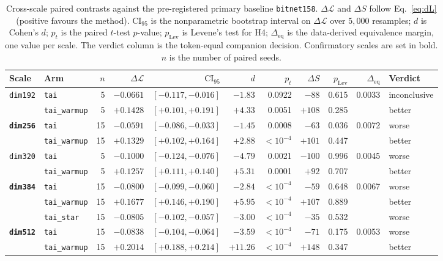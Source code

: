 \documentclass[final,5p,times,twocolumn]{elsarticle}
\theoremstyle{remark}
\newcommand{\dL}{\Delta\mathcal{L}}
\newcommand{\dS}{\Delta S}
\begin{document}
\begin{table}[t]
\centering
\scriptsize
\caption{Cross-scale paired contrasts against the pre-registered primary
baseline \texttt{bitnet158}. $\dL$ and $\dS$ follow Eq.~\eqref{eq:dL}
(positive favours the method). $\mathrm{CI}_{95}$ is the nonparametric
bootstrap interval on $\dL$ over $5{,}000$ resamples; $d$ is Cohen's $d$;
$p_t$ is the paired $t$-test $p$-value; $p_{\mathrm{Lev}}$ is Levene's test for
H4; $\Delta_{\mathrm{eq}}$ is the data-derived equivalence margin, one value
per scale. The verdict column is the token-equal companion decision. Confirmatory scales are set in
bold. $n$ is the number of paired seeds.}
\label{tab:crossscale}
\begin{tabular}{@{}llrrrrrrrrl@{}}
\toprule
Scale & Arm & $n$ & $\dL$ & $\mathrm{CI}_{95}$ & $d$ & $p_t$ & $\dS$ & $p_{\mathrm{Lev}}$ & $\Delta_{\mathrm{eq}}$ & Verdict \\
\midrule
\texttt{dim192} & \texttt{tai} & 5 & $-0.0661$ & $[-0.117,-0.016]$ & $-1.83$ & 0.0922 & $-88$ & 0.615 & 0.0033 & inconclusive \\
& \texttt{tai\_warmup} & 5 & $+0.1428$ & $[+0.101,+0.191]$ & $+4.33$ & 0.0051 & $+108$ & 0.285 &  & better \\
\textbf{\texttt{dim256}} & \texttt{tai} & 15 & $-0.0591$ & $[-0.086,-0.033]$ & $-1.45$ & 0.0008 & $-63$ & 0.036 & 0.0072 & worse \\
& \texttt{tai\_warmup} & 15 & $+0.1329$ & $[+0.102,+0.164]$ & $+2.88$ & $<10^{-4}$ & $+101$ & 0.447 &  & better \\
\texttt{dim320} & \texttt{tai} & 5 & $-0.1000$ & $[-0.124,-0.076]$ & $-4.79$ & 0.0021 & $-100$ & 0.996 & 0.0045 & worse \\
& \texttt{tai\_warmup} & 5 & $+0.1257$ & $[+0.111,+0.140]$ & $+5.31$ & 0.0001 & $+92$ & 0.707 &  & better \\
\textbf{\texttt{dim384}} & \texttt{tai} & 15 & $-0.0800$ & $[-0.099,-0.060]$ & $-2.84$ & $<10^{-4}$ & $-59$ & 0.648 & 0.0067 & worse \\
& \texttt{tai\_warmup} & 15 & $+0.1677$ & $[+0.146,+0.190]$ & $+5.95$ & $<10^{-4}$ & $+107$ & 0.889 &  & better \\
& \texttt{tai\_star} & 15 & $-0.0805$ & $[-0.102,-0.057]$ & $-3.00$ & $<10^{-4}$ & $-35$ & 0.532 &  & worse \\
\textbf{\texttt{dim512}} & \texttt{tai} & 15 & $-0.0838$ & $[-0.104,-0.064]$ & $-3.59$ & $<10^{-4}$ & $-71$ & 0.175 & 0.0053 & worse \\
& \texttt{tai\_warmup} & 15 & $+0.2014$ & $[+0.188,+0.214]$ & $+11.26$ & $<10^{-4}$ & $+148$ & 0.347 &  & better \\

\end{tabular}
\end{table}
\end{document}
